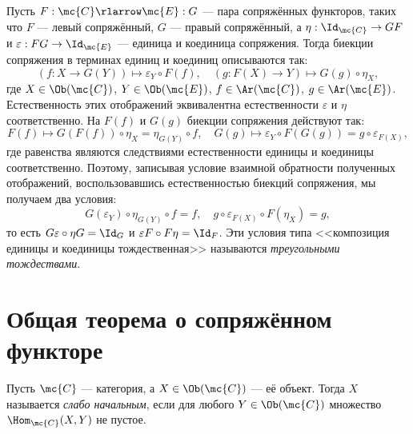 \documentclass[
	extrafontsizes,
	11pt,
	hyphens,
]{memoir}
\begin{document}
Пусть \(F : \mc{C} \rlarrow \mc{E} : G\) --- пара сопряжённых функторов, таких что \(F\) --- левый сопряжённый, \(G\) --- правый сопряжённый, а \(\eta : \Id_{\mc{C}} \to GF\) и \(\varepsilon : FG \to \Id_{\mc{E}}\) --- единица и коединица сопряжения.
Тогда биекции сопряжения в терминах единиц и коединиц описываются так:
\begin{equation*}
(f : X \to G(Y)) \mapsto \varepsilon_Y \circ F(f),
\quad
(g : F(X) \to Y) \mapsto G(g) \circ \eta_X, 
\end{equation*}
где \(X \in \Ob(\mc{C})\), \(Y \in \Ob(\mc{E})\), \(f \in \Ar(\mc{C})\), \(g \in \Ar(\mc{E})\).
Естественность этих отображений эквивалентна естественности \(\varepsilon\) и \(\eta\) соответственно.
На \(F(f)\) и \(G(g)\) биекции сопряжения действуют так:
\begin{equation*}
F(f) \mapsto G(F(f)) \circ \eta_X = \eta_{G(Y)} \circ f,
\quad
G(g) \mapsto \varepsilon_Y \circ F(G(g)) = g \circ \varepsilon_{F(X)},
\end{equation*}
где равенства являются следствиями естественности единицы и коединицы соответственно.
Поэтому, записывая условие взаимной обратности полученных отображений, воспользовавшись естественностью биекций сопряжения, мы получаем два условия:
\begin{equation*}
G(\varepsilon_Y) \circ \eta_{G(Y)} \circ f = f,
\quad
g \circ \varepsilon_{F(X)} \circ F(\eta_X) = g,
\end{equation*}
то есть \(G \varepsilon \circ \eta G = \Id_G\) и \(\varepsilon F \circ F \eta = \Id_F\).
Эти условия типа <<композиция единицы и коединицы тождественная>> называются \emph{треугольными тождествами}.


\section{Общая теорема о сопряжённом функторе}

\begin{definition}
Пусть \(\mc{C}\) --- категория, а \(X \in \Ob(\mc{C})\) --- её объект.
Тогда \(X\) называется \emph{слабо начальным}, если для любого \(Y \in \Ob(\mc{C})\) множество \(\Hom_{\mc{C}}(X, Y)\) не пустое.
\end{definition}
\end{document}
